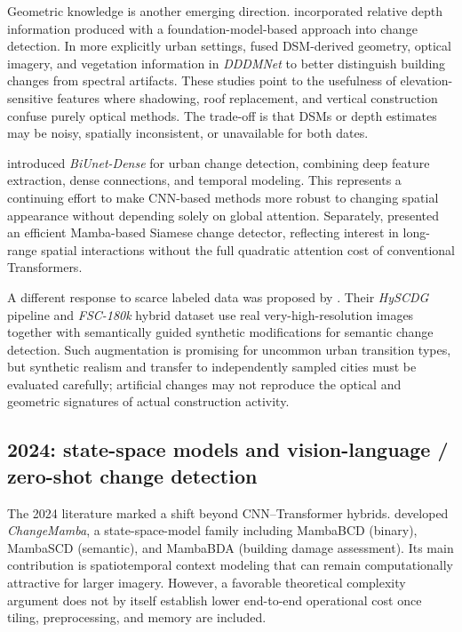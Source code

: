 \documentclass[11pt,a4paper]{article}
\begin{document}
Geometric knowledge is another emerging direction. \citet{Quan2025} incorporated relative depth information produced with a foundation-model-based approach into change detection. In more explicitly urban settings, \citet{Fu2025} fused DSM-derived geometry, optical imagery, and vegetation information in \emph{DDDMNet} to better distinguish building changes from spectral artifacts. These studies point to the usefulness of elevation-sensitive features where shadowing, roof replacement, and vertical construction confuse purely optical methods. The trade-off is that DSMs or depth estimates may be noisy, spatially inconsistent, or unavailable for both dates.

\citet{WangWu2025} introduced \emph{BiUnet-Dense} for urban change detection, combining deep feature extraction, dense connections, and temporal modeling. This represents a continuing effort to make CNN-based methods more robust to changing spatial appearance without depending solely on global attention. Separately, \citet{Paranjape2025} presented an efficient Mamba-based Siamese change detector, reflecting interest in long-range spatial interactions without the full quadratic attention cost of conventional Transformers.

A different response to scarce labeled data was proposed by \citet{Benidir2025}. Their \emph{HySCDG} pipeline and \emph{FSC-180k} hybrid dataset use real very-high-resolution images together with semantically guided synthetic modifications for semantic change detection. Such augmentation is promising for uncommon urban transition types, but synthetic realism and transfer to independently sampled cities must be evaluated carefully; artificial changes may not reproduce the optical and geometric signatures of actual construction activity.

\subsection{2024: state-space models and vision-language / zero-shot change detection}

The 2024 literature marked a shift beyond CNN--Transformer hybrids. \citet{ChenMamba2024} developed \emph{ChangeMamba}, a state-space-model family including MambaBCD (binary), MambaSCD (semantic), and MambaBDA (building damage assessment). Its main contribution is spatiotemporal context modeling that can remain computationally attractive for larger imagery. However, a favorable theoretical complexity argument does not by itself establish lower end-to-end operational cost once tiling, preprocessing, and memory are included.
\end{document}
